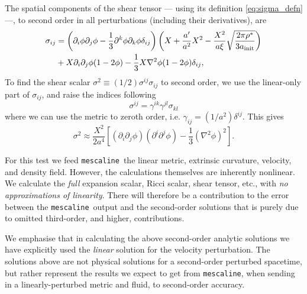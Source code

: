 \documentclass[a4paper]{article}
\newcommand{\pd}{\partial}
\newcommand{\mesc}{\texttt{mescaline}}
\begin{document}
The spatial components of the shear tensor --- using its definition \eqref{eq:sigma_defn} ---, to second order in all perturbations (including their derivatives), are
\begin{equation}
	\begin{aligned}
		\sigma_{ij} &= \left( \pd_i \phi \pd_j \phi - \frac{1}{3} \pd^k \phi \pd_k \phi \delta_{ij} \right) \left( X + \frac{a'}{a^2} X^2 - \frac{X^2}{a\xi} \sqrt{\frac{2\pi\rho^*}{3 a_{\rm init}}}\right) \\
		&+ X\pd_i\pd_j \phi (1-2\phi) - \frac{1}{3}X\nabla^2\phi (1-2\phi) \delta_{ij},
	\end{aligned}
\end{equation}
To find the shear scalar $\sigma^2 \equiv (1/2) \sigma^{ij}\sigma_{ij}$ to second order, we use the linear-only part of $\sigma_{ij}$, and raise the indices following
\begin{equation}
	\sigma^{ij} = \gamma^{ik}\gamma^{jl}\sigma_{kl}
\end{equation}
where we can use the metric to zeroth order, i.e. $\gamma_{ij}=(1/a^2)\delta^{ij}$. This gives
\begin{equation}
	\sigma^2 \approx \frac{X^2}{2a^4} \left[ (\pd_i \pd_j \phi) (\pd^i \pd^j \phi) - \frac{1}{3}(\nabla^2\phi)^2 \right] .
\end{equation}

For this test we feed \mesc\, the linear metric, extrinsic curvature, velocity, and density field. However, the calculations themselves are inherently nonlinear. We calculate the \emph{full} expansion scalar, Ricci scalar, shear tensor, etc., with \emph{no approximations of linearity}. There will therefore be a contribution to the error between the \mesc\, output and the second-order solutions that is purely due to omitted third-order, and higher, contributions. 

We emphasise that in calculating the above second-order analytic solutions we have explicitly used the \emph{linear} solution for the velocity perturbation. The solutions above are not physical solutions for a second-order perturbed spacetime, but rather represent the results we expect to get from \mesc, when sending in a linearly-perturbed metric and fluid, to second-order accuracy. 
\end{document}

